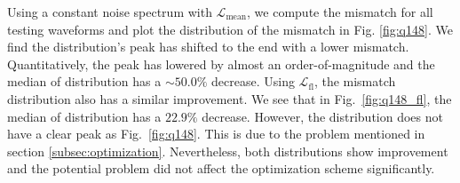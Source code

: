 \documentclass[twocolumn]{aastex631}
\newcommand{\kw}[1]{{\color{rb4}[KW: #1 ]}}
\begin{document}
Using a constant noise spectrum with $\mathcal{L}_{\mathrm{mean}}$, we compute the mismatch for all testing waveforms and plot the distribution of the mismatch in Fig. \ref{fig:q148}. We find the distribution's peak has shifted to the end with a lower mismatch. Quantitatively, the peak has lowered by almost an order-of-magnitude and the median of distribution has a $\sim50.0\%$ decrease. Using $\mathcal{L}_{\mathrm{fl}}$, the mismatch distribution also has a similar improvement. We see that in Fig.~\ref{fig:q148_fl}, the median of distribution has a $22.9\%$ decrease. However, the distribution does not have a clear peak as Fig.~\ref{fig:q148}. This is due to the problem mentioned in section \ref{subsec:optimization}. Nevertheless, both distributions show improvement and the potential problem did not affect the optimization scheme significantly.  

\end{document}
